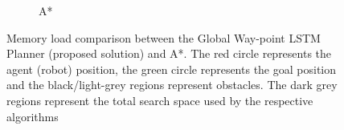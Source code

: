 \begin{figure}[h!]
\begin{subfigure}[b]{0.32\linewidth}
    \caption{A* \newline}
  \end{subfigure}
  \caption{Memory load comparison between the Global Way-point LSTM Planner (proposed solution) and A*. The red circle represents the agent (robot) position, the green circle represents the goal position and the black/light-grey regions represent obstacles. The dark grey regions represent the total search space used by the respective algorithms}
  \label{fig: intro_show}
\end{figure}

\pagebreak







